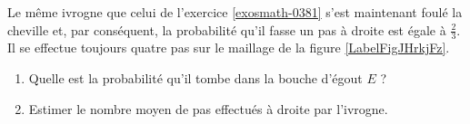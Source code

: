
\begin{exercice}\label{exosmath-0382}

    Le même ivrogne que celui de l'exercice \ref{exosmath-0381} s'est maintenant foulé la cheville et, par conséquent, la probabilité qu'il fasse un pas à droite est égale à \( \frac{ 2 }{ 3 }\). Il se effectue toujours quatre pas sur le maillage de la figure \ref{LabelFigJHrkjFz}.

    \begin{enumerate}
        \item
    Quelle est la probabilité qu'il tombe dans la bouche d'égout \( E\) ?
\item
    Estimer le nombre moyen de pas effectués à droite par l'ivrogne.
    \end{enumerate}

\end{exercice}
